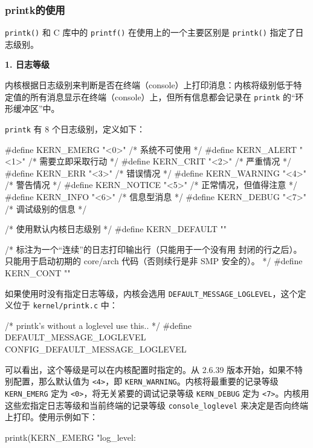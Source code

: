 \subsubsection{printk的使用}\label{sec:02-software-preparation-022}

\texttt{printk()} 和 C 库中的 \texttt{printf()} 在使用上的一个主要区别是 \texttt{printk()} 指定了日志级别。

\textbf{1. 日志等级}

内核根据日志级别来判断是否在终端（console）上打印消息：内核将级别低于特定值的所有消息显示在终端（console）上，但所有信息都会记录在 \texttt{printk} 的``环形缓冲区''中。

\texttt{printk} 有 8 个日志级别，定义如下：

\begin{CodeBlock}[language=BookC]
#define KERN_EMERG   "<0>" /* 系统不可使用 */
#define KERN_ALERT   "<1>" /* 需要立即采取行动 */
#define KERN_CRIT    "<2>" /* 严重情况 */
#define KERN_ERR     "<3>" /* 错误情况 */
#define KERN_WARNING "<4>" /* 警告情况 */
#define KERN_NOTICE  "<5>" /* 正常情况，但值得注意 */
#define KERN_INFO    "<6>" /* 信息型消息 */
#define KERN_DEBUG   "<7>" /* 调试级别的信息 */

/* 使用默认内核日志级别 */
#define KERN_DEFAULT ""

/* 标注为一个“连续”的日志打印输出行（只能用于一个没有用 \n 封闭的行之后）。只能用于启动初期的 core/arch 代码（否则续行是非 SMP 安全的）。 */
#define KERN_CONT ""
\end{CodeBlock}

如果使用时没有指定日志等级，内核会选用 \texttt{DEFAULT\_MESSAGE\_LOGLEVEL}，这个定义位于 \texttt{kernel/printk.c} 中：

\begin{CodeBlock}[language=BookC]
/* printk's without a loglevel use this.. */
#define DEFAULT_MESSAGE_LOGLEVEL CONFIG_DEFAULT_MESSAGE_LOGLEVEL
\end{CodeBlock}

可以看出，这个等级是可以在内核配置时指定的。从 2.6.39 版本开始，如果不特别配置，那么默认值为 \texttt{\textless{}4\textgreater{}}，即 \texttt{KERN\_WARNING}。内核将最重要的记录等级 \texttt{KERN\_EMERG} 定为 \texttt{\textless{}0\textgreater{}}，将无关紧要的调试记录等级 \texttt{KERN\_DEBUG} 定为 \texttt{\textless{}7\textgreater{}}。内核用这些宏指定日志等级和当前终端的记录等级 \texttt{console\_loglevel} 来决定是否向终端上打印。使用示例如下：

\begin{CodeBlock}[language=BookC]
printk(KERN_EMERG "log_level:%
\end{CodeBlock}

